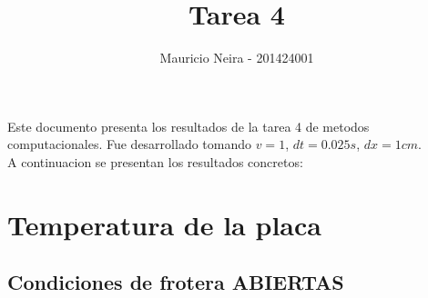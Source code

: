 \documentclass{article}
\begin{document}
\title{Tarea 4}
\author{Mauricio Neira - 201424001}

\maketitle

Este documento presenta los resultados de la tarea 4 de metodos computacionales. Fue desarrollado tomando $v = 1$, $dt = 0.025s$, $dx = 1cm$. \\

A continuacion se presentan los resultados concretos:

\section{Temperatura de la placa}
\subsection{Condiciones de frotera ABIERTAS}
\end{document}
